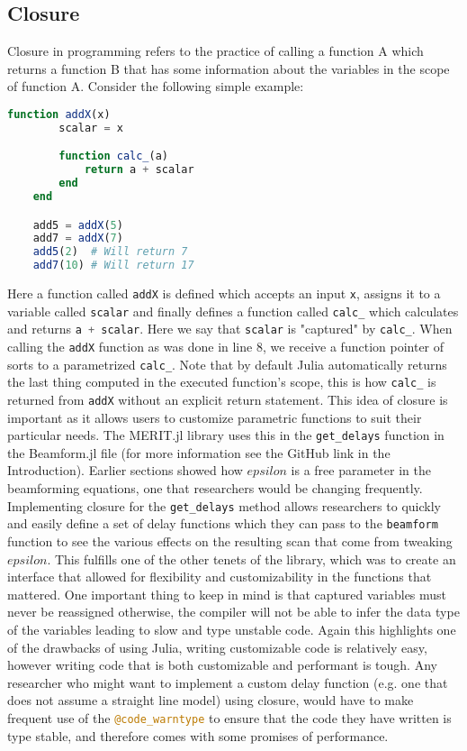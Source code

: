 \subsection{Closure}
Closure in programming refers to the practice of calling a function A which returns a function B that has some
information about the variables in the scope of function A. Consider the following simple example:
\begin{lstlisting}[language=Julia]
    function addX(x)
        scalar = x

        function calc_(a)
            return a + scalar
        end
    end

    add5 = addX(5)
    add7 = addX(7)
    add5(2)  # Will return 7
    add7(10) # Will return 17
\end{lstlisting}
Here a function called \lstinline[language=Julia]{addX} is defined which accepts an input \lstinline[language=Julia]{x},
assigns it to a variable called \lstinline[language=Julia]{scalar} and finally defines a function called
\lstinline[language=Julia]{calc_} which calculates and returns \lstinline[language=Julia]{a + scalar}. Here we say that
\lstinline[language=Julia]{scalar} is "captured" by \lstinline[language=Julia]{calc_}. When calling the
\lstinline[language=Julia]{addX} function as was done in line 8, we receive a function pointer of sorts to a
parametrized \lstinline[language=Julia]{calc_}. Note that by default Julia automatically returns the last thing computed
in the executed function's scope, this is how \lstinline[language=Julia]{calc_} is returned from
\lstinline[language=Julia]{addX} without an explicit return statement. This idea of closure is important as it allows
users to customize parametric functions to suit their particular needs. The MERIT.jl library uses this in the
\lstinline[language=Julia]{get_delays} function in the Beamform.jl file (for more information see the GitHub link in
the Introduction). Earlier sections showed
how $epsilon$ is a free parameter in the beamforming equations, one that researchers would be changing frequently.
Implementing closure for the \lstinline[language=Julia]{get_delays} method allows researchers to quickly and easily
define a set of delay functions which they can pass to the \lstinline[language=Julia]{beamform} function to see the
various effects on the resulting scan that come from tweaking $epsilon$. This fulfills one of the other tenets of the
library, which was to create an interface that allowed for flexibility and customizability in the functions that
mattered. One important thing to keep in mind is that captured variables must never be reassigned otherwise, the
compiler will not be able to infer the data type of the variables leading to slow and type unstable code. Again this
highlights one of the drawbacks of using Julia, writing customizable code is relatively easy, however writing code that
is both customizable and performant is tough. Any researcher who might want to implement a custom delay function (e.g.
one that does not assume a straight line model) using closure, would have to make frequent use of the
\lstinline[language=Julia]{@code_warntype} to ensure that the code they have written is type stable, and therefore comes
with some promises of performance.  

